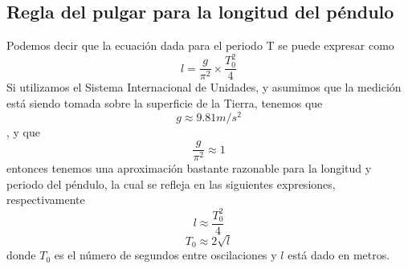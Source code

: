 \documentclass[12 pt,twocolumn]{article}
\begin{document}
\subsection{\small Regla del pulgar para la longitud del péndulo}
Podemos decir que la ecuación dada para el periodo T se puede expresar como $$l=\frac{g}{\pi^2}\times\frac{T_0^2}{4}$$
Si utilizamos el Sistema Internacional de Unidades, y asumimos que la medición está siendo tomada sobre la superficie de la Tierra, tenemos que $$g\approx 9.81 m/s^2$$, y que $$\frac{g}{\pi^2}\approx1$$ entonces tenemos una aproximación bastante razonable para la longitud y periodo del péndulo, la cual se refleja en las siguientes expresiones, respectivamente $$l\approx\frac {T_0^2}{4}$$ $$T_0\approx 2\sqrt{l}$$ donde $T_0$ es el número de segundos entre oscilaciones y $l$ está dado en metros.
\end{document}
